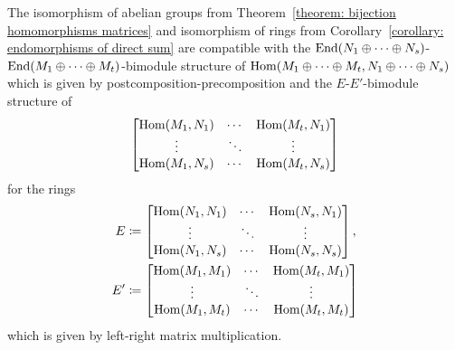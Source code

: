 \begin{proposition}
  The isomorphism of abelian groups from Theorem~\ref{theorem: bijection homomorphisms matrices} and isomorphism of rings from Corollary~\ref{corollary: endomorphisms of direct sum} are compatible with the $\operatorname{End}(N_1 \oplus \dotsb \oplus N_s)$-$\operatorname{End}(M_1 \oplus \dotsb \oplus M_t)$-bimodule structure of $\operatorname{Hom}(M_1 \oplus \dotsb \oplus M_t, N_1 \oplus \dotsb \oplus N_s)$ which is given by postcomposition-precomposition and the $E$-$E'$-bimodule structure of
  \[
    \begin{bmatrix}
      \operatorname{Hom}(M_1, N_1)  & \cdots  & \operatorname{Hom}(M_t, N_1)  \\
      \vdots          & \ddots  & \vdots          \\
      \operatorname{Hom}(M_1, N_s)  & \cdots  & \operatorname{Hom}(M_t, N_s)
    \end{bmatrix}
  \]
  for the rings
  \begin{align*}
              E
    &\coloneqq \begin{bmatrix}
                \operatorname{Hom}(N_1, N_1)  & \cdots  & \operatorname{Hom}(N_s, N_1)  \\
                \vdots          & \ddots  & \vdots          \\
                \operatorname{Hom}(N_1, N_s)  & \cdots  & \operatorname{Hom}(N_s, N_s)
              \end{bmatrix},
    \\
              E'
    &\coloneqq \begin{bmatrix}
                \operatorname{Hom}(M_1, M_1)  & \cdots  & \operatorname{Hom}(M_t, M_1)  \\
                \vdots          & \ddots  & \vdots          \\
                \operatorname{Hom}(M_1, M_t)  & \cdots  & \operatorname{Hom}(M_t, M_t)
              \end{bmatrix}
  \end{align*}
  which is given by left-right matrix multiplication.
\end{proposition}




